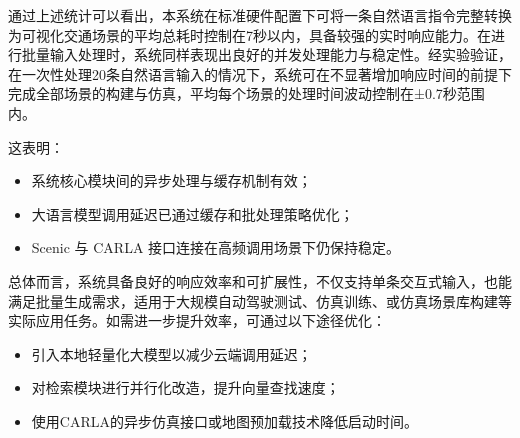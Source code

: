 通过上述统计可以看出，本系统在标准硬件配置下可将一条自然语言指令完整转换为可视化交通场景的平均总耗时控制在7秒以内，具备较强的实时响应能力。在进行批量输入处理时，系统同样表现出良好的并发处理能力与稳定性。经实验验证，在一次性处理20条自然语言输入的情况下，系统可在不显著增加响应时间的前提下完成全部场景的构建与仿真，平均每个场景的处理时间波动控制在±0.7秒范围内。

这表明：
\begin{itemize}
	\item 系统核心模块间的异步处理与缓存机制有效；
	\item 大语言模型调用延迟已通过缓存和批处理策略优化；
	\item Scenic 与 CARLA 接口连接在高频调用场景下仍保持稳定。
\end{itemize}

总体而言，系统具备良好的响应效率和可扩展性，不仅支持单条交互式输入，也能满足批量生成需求，适用于大规模自动驾驶测试、仿真训练、或仿真场景库构建等实际应用任务。如需进一步提升效率，可通过以下途径优化：
\begin{itemize}
	\item 引入本地轻量化大模型以减少云端调用延迟；
	\item 对检索模块进行并行化改造，提升向量查找速度；
	\item 使用CARLA的异步仿真接口或地图预加载技术降低启动时间。
\end{itemize}
